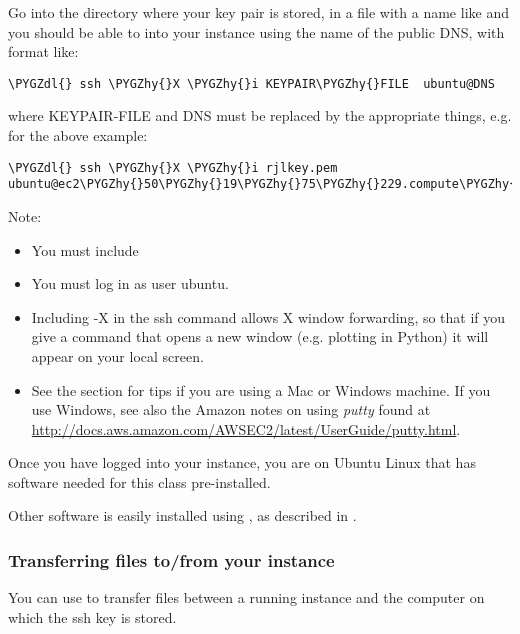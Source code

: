 \documentclass[letterpaper,10pt,english]{sphinxmanual}
\def\PYGZdl{\char`\$}
\def\PYGZhy{\char`\-}
\begin{document}
Go into the directory where your key pair is stored, in a file with a name
like  and you should be able to  into your instance using
the name of the public DNS, with format like:

\begin{Verbatim}[commandchars=\\\{\}]
\PYGZdl{} ssh \PYGZhy{}X \PYGZhy{}i KEYPAIR\PYGZhy{}FILE  ubuntu@DNS
\end{Verbatim}

where KEYPAIR-FILE and DNS must be replaced by the appropriate
things, e.g. for the above example:

\begin{Verbatim}[commandchars=\\\{\}]
\PYGZdl{} ssh \PYGZhy{}X \PYGZhy{}i rjlkey.pem ubuntu@ec2\PYGZhy{}50\PYGZhy{}19\PYGZhy{}75\PYGZhy{}229.compute\PYGZhy{}1.amazonaws.com
\end{Verbatim}

Note:
\begin{itemize}
\item {} 
You must include 

\item {} 
You must log in as user ubuntu.

\item {} 
Including -X in the ssh command allows X window forwarding, so that if you
give a command that opens a new window (e.g. plotting in Python) it will
appear on your local screen.

\item {} 
See the section {\hyperref[ssh:ssh]{}} for tips if you are using a Mac or Windows
machine.
If you use Windows, see also the Amazon notes on using \emph{putty} found at
\url{http://docs.aws.amazon.com/AWSEC2/latest/UserGuide/putty.html}.

\end{itemize}

Once you have logged into your instance, you are on Ubuntu Linux that has
software needed for this class pre-installed.

Other software is easily installed using , as described
in {\hyperref[software_installation:software\string-installation]{}}.


\subsubsection{Transferring files to/from your instance}
\label{2013/aws:transferring-files-to-from-your-instance}
You can use  to transfer files between a running instance and
the computer on which the ssh key is stored.
\end{document}

